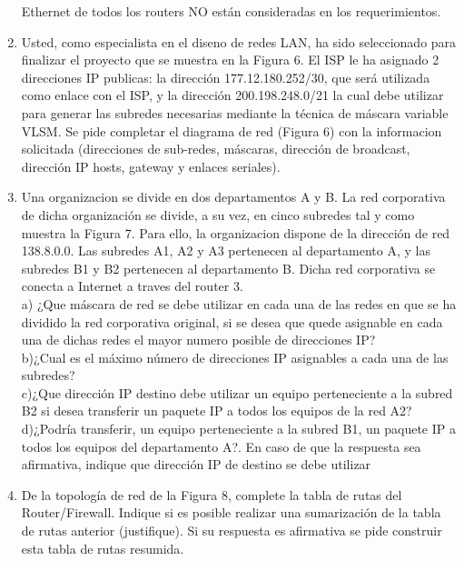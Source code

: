 \documentclass{udparticle}
\begin{document}
\begin{enumerate}
Ethernet de todos los routers NO están consideradas en los requerimientos.
\item Usted, como especialista en el diseno de redes LAN, ha sido seleccionado para
finalizar el proyecto que se muestra en la Figura 6. El ISP le ha asignado 2 
direcciones IP publicas: la dirección 177.12.180.252/30, que será utilizada como 
enlace con el ISP, y la dirección 200.198.248.0/21 la cual debe utilizar para 
generar las subredes necesarias mediante la técnica de máscara variable VLSM.
Se pide completar el diagrama de red (Figura 6) con la informacion solicitada
(direcciones de sub-redes, máscaras, dirección de broadcast, dirección IP 
hosts, gateway y enlaces seriales).
\clearpage
\item Una organizacion se divide en dos departamentos A y B. La red corporativa de 
dicha organización se divide, a su vez, en cinco subredes tal y como muestra la 
Figura 7. Para ello, la organizacion dispone de la dirección de red 138.8.0.0. 
Las subredes A1, A2 y A3 pertenecen al departamento A, y las subredes B1 y B2 
pertenecen al departamento B. Dicha red corporativa se conecta a Internet    a traves 
del router 3.\\
a) ¿Que máscara de red se debe utilizar en cada una de las redes en que se ha   
dividido la red corporativa original, si se desea que quede asignable en cada una 
de dichas redes el mayor numero posible de direcciones IP?\\

b)¿Cual es el máximo número de direcciones IP asignables a cada una de las subredes?\\

c)¿Que dirección IP destino debe utilizar un equipo perteneciente a la subred B2 si
desea transferir un paquete IP a todos los equipos de la red A2?\\

d)¿Podría transferir, un equipo perteneciente a la subred B1, un paquete IP a todos
los equipos del departamento A?. En caso de que la respuesta sea afirmativa,
indique que dirección IP de destino se debe utilizar\\


\item De la topología de red de la Figura 8, complete la tabla de rutas del 
Router/Firewall. Indique si es posible realizar una sumarización de la tabla de 
rutas anterior (justifique). Si su respuesta es afirmativa se pide construir esta tabla de rutas resumida.


\end{enumerate}
\end{document}
